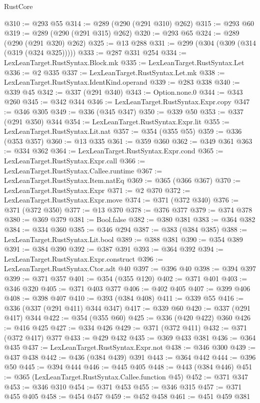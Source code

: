 \begin{lexlean}{RustCore}
\begin{coremodule}
@310 := @293 @55
@314 := @289 (@290 (@291 @310) @262)
@315 := @293 @60
@319 := @289 (@290 (@291 @315) @262)
@320 := @293 @65
@324 := @289 (@290 (@291 @320) @262)
@325 := @13 @288
@331 := @299 (@304 (@309 (@314 (@319 (@324 @325)))))
@333 := @287 @331 @254
@334 := LexLeanTarget.RustSyntax.Block.mk
@335 := LexLeanTarget.RustSyntax.Let
@336 := @2 @335
@337 := LexLeanTarget.RustSyntax.Let.mk
@338 := LexLeanTarget.RustSyntax.IdentKind.operand
@339 := @283 @338
@340 := @339 @45
@342 := @337 (@291 @340)
@343 := Option.none.{0}
@344 := @343 @260
@345 := @342 @344
@346 := LexLeanTarget.RustSyntax.Expr.copy
@347 := @346 @305
@349 := @336 (@345 @347)
@350 := @339 @50
@353 := @337 (@291 @350) @344
@354 := LexLeanTarget.RustSyntax.Expr.lit
@355 := LexLeanTarget.RustSyntax.Lit.nat
@357 := @354 (@355 @55)
@359 := @336 (@353 @357)
@360 := @13 @335
@361 := @359 @360
@362 := @349 @361
@363 := @334 @362
@364 := LexLeanTarget.RustSyntax.Expr.cond
@365 := LexLeanTarget.RustSyntax.Expr.call
@366 := LexLeanTarget.RustSyntax.Callee.runtime
@367 := LexLeanTarget.RustSyntax.Item.natEq
@369 := @365 (@366 @367)
@370 := LexLeanTarget.RustSyntax.Expr
@371 := @2 @370
@372 := LexLeanTarget.RustSyntax.Expr.move
@374 := @371 (@372 @340)
@376 := @371 (@372 @350)
@377 := @13 @370
@378 := @376 @377
@379 := @374 @378
@380 := @369 @379
@381 := Bool.false
@382 := @380 @381
@383 := @364 @382
@384 := @334 @360
@385 := @346 @294
@387 := @383 (@384 @385)
@388 := LexLeanTarget.RustSyntax.Lit.bool
@389 := @388 @381
@390 := @354 @389
@391 := @384 @390
@392 := @387 @391
@393 := @364 @392
@394 := LexLeanTarget.RustSyntax.Expr.construct
@396 := LexLeanTarget.RustSyntax.Ctor.adt @40
@397 := @396 @40
@398 := @394 @397
@399 := @371 @357
@401 := @354 (@355 @120)
@402 := @371 @401
@403 := @346 @320
@405 := @371 @403 @377
@406 := @402 @405
@407 := @399 @406
@408 := @398 @407
@410 := @393 (@384 @408)
@411 := @339 @55
@416 := @336 (@337 (@291 @411) @344 @347)
@417 := @339 @60
@420 := @337 (@291 @417) @344
@422 := @354 (@355 @60)
@425 := @336 (@420 @422) @360
@426 := @416 @425
@427 := @334 @426
@429 := @371 (@372 @411)
@432 := @371 (@372 @417) @377
@433 := @429 @432
@435 := @369 @433 @381
@436 := @364 @435
@437 := LexLeanTarget.RustSyntax.Expr.not
@438 := @346 @300
@439 := @437 @438
@442 := @436 (@384 @439) @391
@443 := @364 @442
@444 := @396 @50
@445 := @394 @444
@446 := @445 @405
@448 := @443 (@384 @446)
@451 := @365 (LexLeanTarget.RustSyntax.Callee.function @45)
@452 := @371 @347
@453 := @346 @310
@454 := @371 @453
@455 := @346 @315
@457 := @371 @455 @405
@458 := @454 @457
@459 := @452 @458
@461 := @451 @459 @381

\end{coremodule}
\end{lexlean}
